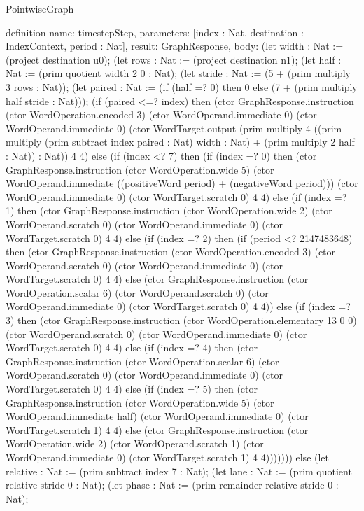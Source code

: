 \begin{lexlean}{PointwiseGraph}
\begin{semanticmodule}
definition{
  name: timestepStep,
  parameters: [index : Nat, destination : IndexContext, period : Nat],
  result: GraphResponse,
  body: (let width : Nat := (project destination u0);
      (let rows : Nat := (project destination n1);
      (let half : Nat := (prim quotient width 2 0 : Nat);
      (let stride : Nat := (5 + (prim multiply 3 rows : Nat));
      (let paired : Nat := (if (half =? 0) then 0 else (7 + (prim multiply half stride : Nat)));
      (if (paired <=? index) then (ctor GraphResponse.instruction (ctor WordOperation.encoded 3) (ctor WordOperand.immediate 0) (ctor WordOperand.immediate 0) (ctor WordTarget.output (prim multiply 4 ((prim multiply (prim subtract index paired : Nat) width : Nat) + (prim multiply 2 half : Nat)) : Nat)) 4 4) else (if (index <? 7) then (if (index =? 0) then (ctor GraphResponse.instruction (ctor WordOperation.wide 5) (ctor WordOperand.immediate ((positiveWord period) + (negativeWord period))) (ctor WordOperand.immediate 0) (ctor WordTarget.scratch 0) 4 4) else (if (index =? 1) then (ctor GraphResponse.instruction (ctor WordOperation.wide 2) (ctor WordOperand.scratch 0) (ctor WordOperand.immediate 0) (ctor WordTarget.scratch 0) 4 4) else (if (index =? 2) then (if (period <? 2147483648) then (ctor GraphResponse.instruction (ctor WordOperation.encoded 3) (ctor WordOperand.scratch 0) (ctor WordOperand.immediate 0) (ctor WordTarget.scratch 0) 4 4) else (ctor GraphResponse.instruction (ctor WordOperation.scalar 6) (ctor WordOperand.scratch 0) (ctor WordOperand.immediate 0) (ctor WordTarget.scratch 0) 4 4)) else (if (index =? 3) then (ctor GraphResponse.instruction (ctor WordOperation.elementary 13 0 0) (ctor WordOperand.scratch 0) (ctor WordOperand.immediate 0) (ctor WordTarget.scratch 0) 4 4) else (if (index =? 4) then (ctor GraphResponse.instruction (ctor WordOperation.scalar 6) (ctor WordOperand.scratch 0) (ctor WordOperand.immediate 0) (ctor WordTarget.scratch 0) 4 4) else (if (index =? 5) then (ctor GraphResponse.instruction (ctor WordOperation.wide 5) (ctor WordOperand.immediate half) (ctor WordOperand.immediate 0) (ctor WordTarget.scratch 1) 4 4) else (ctor GraphResponse.instruction (ctor WordOperation.wide 2) (ctor WordOperand.scratch 1) (ctor WordOperand.immediate 0) (ctor WordTarget.scratch 1) 4 4))))))) else (let relative : Nat := (prim subtract index 7 : Nat);
      (let lane : Nat := (prim quotient relative stride 0 : Nat);
      (let phase : Nat := (prim remainder relative stride 0 : Nat);
}
\end{semanticmodule}
\end{lexlean}
